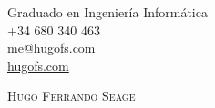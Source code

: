 \documentclass[a4paper, 12pt]{article}
\begin{document}
\pagestyle{empty} %

\begin{flushright}
    Graduado en Ingeniería Informática\\
    +34 680 340 463\\
    \href{mailto: me@hugofs.com}{me@hugofs.com}\\
    \href{https://hugofs.com}{hugofs.com}\\
\end{flushright}

\vspace{-27mm} %

\begin{figure}[ht!]
    \begin{flushleft}
    \end{flushleft}
\end{figure}

{\textsc {\Huge \vspace{5mm} \hspace{-13mm} Hugo Ferrando Seage}}\\
\end{document}
